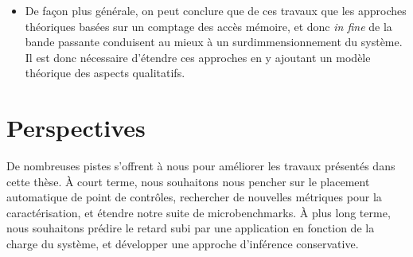 \begin{itemize}
	\item De façon plus générale, on peut conclure que de ces travaux que les approches théoriques basées sur un comptage des accès mémoire, et donc \emph{in fine} de la bande passante conduisent au mieux à un surdimmensionnement du système.
	Il est donc nécessaire d'étendre ces approches en y ajoutant un modèle théorique des aspects qualitatifs.


\end{itemize}

\section{Perspectives}


De nombreuses pistes s'offrent à nous pour améliorer les travaux présentés dans cette thèse.
À court terme, nous souhaitons nous pencher sur le placement automatique de point de contrôles, rechercher de nouvelles métriques pour la caractérisation, et étendre notre suite de microbenchmarks.
À plus long terme, nous souhaitons prédire le retard subi par une application en fonction de la charge du système, et développer une approche d'inférence conservative.


